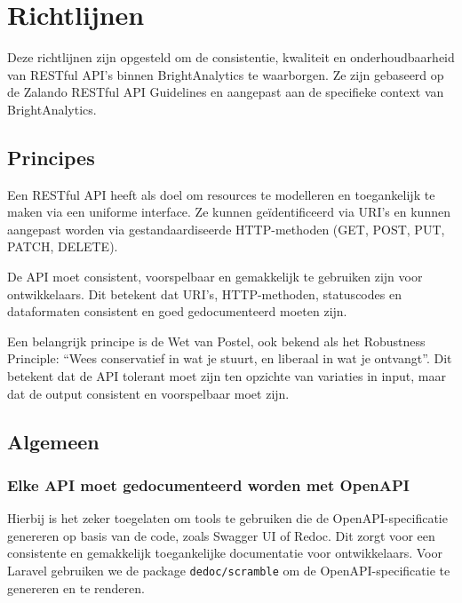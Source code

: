 \chapter{Richtlijnen}
\label{ch:richtlijnen}

Deze richtlijnen zijn opgesteld om de consistentie, kwaliteit en onderhoudbaarheid van RESTful API's binnen BrightAnalytics te waarborgen. Ze zijn gebaseerd op de Zalando RESTful API Guidelines \autocite{ZAG2024} en aangepast aan de specifieke context van BrightAnalytics.

\section{Principes}

Een RESTful API heeft als doel om resources te modelleren en toegankelijk te maken via een uniforme interface. Ze kunnen ge\"identificeerd via URI's en kunnen aangepast worden via gestandaardiseerde HTTP-methoden (GET, POST, PUT, PATCH, DELETE).

\bigskip

De API moet consistent, voorspelbaar en gemakkelijk te gebruiken zijn voor ontwikkelaars. Dit betekent dat URI's, HTTP-methoden, statuscodes en dataformaten consistent en goed gedocumenteerd moeten zijn.

\bigskip

Een belangrijk principe is de Wet van Postel, ook bekend als het Robustness Principle: ``Wees conservatief in wat je stuurt, en liberaal in wat je ontvangt''. Dit betekent dat de API tolerant moet zijn ten opzichte van variaties in input, maar dat de output consistent en voorspelbaar moet zijn.

\section{Algemeen}

\subsection{Elke API moet gedocumenteerd worden met OpenAPI}
\label{section:openapi_documentatie}

Hierbij is het zeker toegelaten om tools te gebruiken die de OpenAPI-specificatie genereren op basis van de code, zoals Swagger UI of Redoc. Dit zorgt voor een consistente en gemakkelijk toegankelijke documentatie voor ontwikkelaars. Voor Laravel gebruiken we de package \texttt{dedoc/scramble} om de OpenAPI-specificatie te genereren en te renderen.

